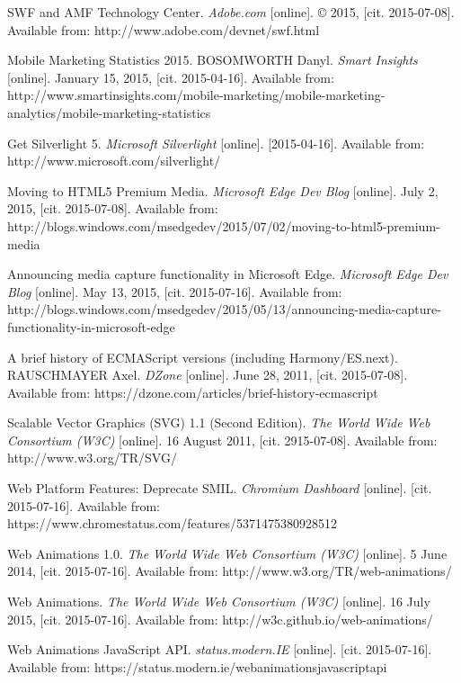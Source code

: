 \begin{thebibliography}{99}
SWF and AMF Technology Center. \emph{Adobe.com} [online]. © 2015, [cit. 2015-07-08]. Available from: http://www.adobe.com/devnet/swf.html

Mobile Marketing Statistics 2015. BOSOMWORTH Danyl. \emph{Smart Insights} [online]. January 15, 2015, [cit. 2015-04-16]. Available from: http://www.smartinsights.com/mobile-marketing/mobile-marketing-analytics/mobile-marketing-statistics

Get Silverlight 5. \emph{Microsoft Silverlight} [online]. [2015-04-16]. Available from: http://www.microsoft.com/silverlight/

Moving to HTML5 Premium Media. \emph{Microsoft Edge Dev Blog} [online]. July 2, 2015, [cit. 2015-07-08]. Available from: http://blogs.windows.com/msedgedev/2015/07/02/moving-to-html5-premium-media

Announcing media capture functionality in Microsoft Edge. \emph{Microsoft Edge Dev Blog} [online]. May 13, 2015, [cit. 2015-07-16]. Available from: http://blogs.windows.com/msedgedev/2015/05/13/announcing-media-capture-functionality-in-microsoft-edge

A brief history of ECMAScript versions (including Harmony/ES.next). RAUSCHMAYER Axel. \emph{DZone} [online]. June 28, 2011, [cit. 2015-07-08]. Available from: https://dzone.com/articles/brief-history-ecmascript

Scalable Vector Graphics (SVG) 1.1 (Second Edition). \emph{The World Wide Web Consortium (W3C)} [online]. 16 August 2011, [cit. 2915-07-08]. Available from: http://www.w3.org/TR/SVG/

Web Platform Features: Deprecate SMIL. \emph{Chromium Dashboard} [online]. [cit. 2015-07-16]. Available from: https://www.chromestatus.com/features/5371475380928512

Web Animations 1.0. \emph{The World Wide Web Consortium (W3C)} [online]. 5 June 2014, [cit. 2015-07-16]. Available from: http://www.w3.org/TR/web-animations/

Web Animations. \emph{The World Wide Web Consortium (W3C)} [online]. 16 July 2015, [cit. 2015-07-16]. Available from: http://w3c.github.io/web-animations/

Web Animations JavaScript API. \emph{status.modern.IE} [online]. [cit. 2015-07-16]. Available from: https://status.modern.ie/webanimationsjavascriptapi


\end{thebibliography}
